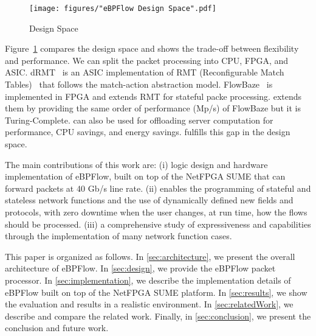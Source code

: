  \begin{figure}[!htp]
 \centering
\texttt{[image: figures/"eBPFlow Design Space".pdf]}
 \caption{Design Space}
 \label{fig:Comparison}
 \end{figure}

Figure~\ref{fig:Comparison} compares the design space and shows the trade-off between flexibility and performance. 
We can split the packet processing into CPU, FPGA, and ASIC.
dRMT~\cite{chole2017drmt} is an ASIC implementation of RMT (Reconfigurable Match Tables)~\cite{bosshart2013forwarding} that follows the match-action abstraction model. FlowBaze~\cite{FlowBlaze2019} is implemented in FPGA and extends RMT for stateful packe processing.
\system extends them by providing the same order of performance (Mp/s) of FlowBaze but it is Turing-Complete.
\system can also be used for offloading server computation for performance, CPU savings, and energy savings. 
\system fulfills this gap in the design space.






The main contributions of this work are: 
(i) logic design and hardware implementation of eBPFlow, built on top of the NetFPGA SUME that can forward packets at 40 Gb/s line rate.
(ii) \system enables the programming of stateful and stateless network functions and the use of dynamically defined new fields and protocols, with zero downtime when the user changes, at run time, how the flows should be processed.
(iii) a comprehensive study of \system expressiveness and capabilities through the implementation of many network function cases.


This paper is organized as follows. In \textsection\ref{sec:architecture}, we present the overall architecture of eBPFlow. In \textsection\ref{sec:design}, we provide the eBPFlow packet processor. In \textsection\ref{sec:implementation}, we describe the implementation details of eBPFlow built on top of the NetFPGA SUME platform. In \textsection\ref{sec:results}, we show the evaluation and results in a realistic environment. 
In \textsection\ref{sec:relatedWork}, we describe and compare the related work. Finally, in \textsection\ref{sec:conclusion}, we present the conclusion and future work.
